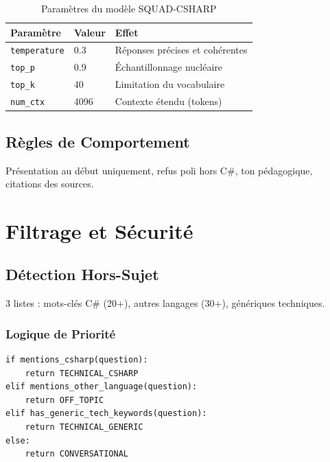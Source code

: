 \documentclass[12pt,a4paper]{report}
\begin{document}
\begin{table}[H]
    \centering
    \begin{tabular}{|l|l|l|}
        \hline
        \rowcolor{green!20}
        \textbf{Paramètre} & \textbf{Valeur} & \textbf{Effet} \\
        \hline
        \texttt{temperature} & 0.3 & Réponses précises et cohérentes \\
        \hline
        \texttt{top\_p} & 0.9 & Échantillonnage nucléaire \\
        \hline
        \texttt{top\_k} & 40 & Limitation du vocabulaire \\
        \hline
        \texttt{num\_ctx} & 4096 & Contexte étendu (tokens) \\
        \hline
    \end{tabular}
    \caption{Paramètres du modèle SQUAD-CSHARP}
\end{table}

\subsection{Règles de Comportement}

Présentation au début uniquement, refus poli hors C\#, ton pédagogique, citations des sources.

\section{Filtrage et Sécurité}

\subsection{Détection Hors-Sujet}

3 listes : mots-clés C\# (20+), autres langages (30+), génériques techniques.

\subsubsection{Logique de Priorité}

\begin{lstlisting}[style=python, caption=Algorithme de détection]
if mentions_csharp(question):
    return TECHNICAL_CSHARP
elif mentions_other_language(question):
    return OFF_TOPIC
elif has_generic_tech_keywords(question):
    return TECHNICAL_GENERIC
else:
    return CONVERSATIONAL
\end{lstlisting}
\end{document}
